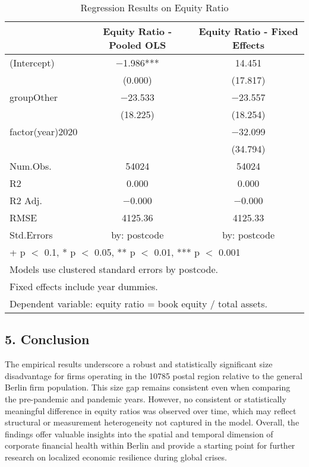 \documentclass[
  12pt,
]{article}
\begin{document}
\begin{table}
\centering
\caption{\label{tab:regression-3b}Regression Results on Equity Ratio}
\centering
\begin{tabular}[t]{lcc}
\toprule
  & Equity Ratio - Pooled OLS & Equity Ratio - Fixed Effects\\
\midrule
(Intercept) & \num{-1.986}*** & \num{14.451}\\
 & (\num{0.000}) & (\num{17.817})\\
groupOther & \num{-23.533} & \num{-23.557}\\
 & (\num{18.225}) & (\num{18.254})\\
factor(year)2020 &  & \num{-32.099}\\
 &  & (\num{34.794})\\
\midrule
Num.Obs. & \num{54024} & \num{54024}\\
R2 & \num{0.000} & \num{0.000}\\
R2 Adj. & \num{-0.000} & \num{-0.000}\\
RMSE & \num{4125.36} & \num{4125.33}\\
Std.Errors & by: postcode & by: postcode\\
\bottomrule
\multicolumn{3}{l}{\rule{0pt}{1em}+ p $<$ 0.1, * p $<$ 0.05, ** p $<$ 0.01, *** p $<$ 0.001}\\
\multicolumn{3}{l}{\rule{0pt}{1em}Models use clustered standard errors by postcode.}\\
\multicolumn{3}{l}{\rule{0pt}{1em}Fixed effects include year dummies.}\\
\multicolumn{3}{l}{\rule{0pt}{1em}Dependent variable: equity ratio = book equity / total assets.}\\
\end{tabular}
\end{table}

\FloatBarrier

\subsection{5. Conclusion}\label{conclusion}

The empirical results underscore a robust and statistically significant
size disadvantage for firms operating in the 10785 postal region
relative to the general Berlin firm population. This size gap remains
consistent even when comparing the pre-pandemic and pandemic years.
However, no consistent or statistically meaningful difference in equity
ratios was observed over time, which may reflect structural or
measurement heterogeneity not captured in the model. Overall, the
findings offer valuable insights into the spatial and temporal dimension
of corporate financial health within Berlin and provide a starting point
for further research on localized economic resilience during global
crises.
\end{document}

